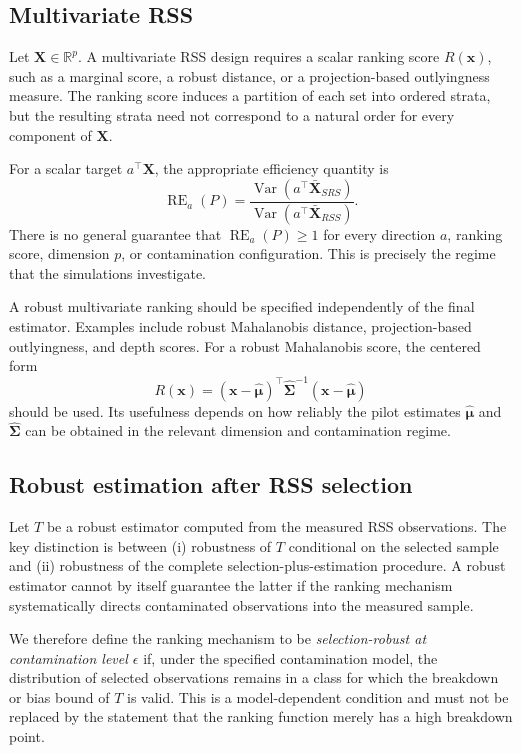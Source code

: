 \documentclass[12pt]{article}
\begin{document}
\subsection{Multivariate RSS}
Let $\mathbf X\in\mathbb R^p$. A multivariate RSS design requires a scalar ranking score $R(\mathbf x)$, such as a marginal score, a robust distance, or a projection-based outlyingness measure. The ranking score induces a partition of each set into ordered strata, but the resulting strata need not correspond to a natural order for every component of $\mathbf X$.

For a scalar target $a^\top\mathbf X$, the appropriate efficiency quantity is
\begin{equation}
\label{eq:multivariate_target}
\operatorname{RE}_a(P)=
\frac{\operatorname{Var}(a^\top\bar{\mathbf X}_{SRS})}
{\operatorname{Var}(a^\top\bar{\mathbf X}_{RSS})}.
\end{equation}
There is no general guarantee that $\operatorname{RE}_a(P)\geq1$ for every direction $a$, ranking score, dimension $p$, or contamination configuration. This is precisely the regime that the simulations investigate.

A robust multivariate ranking should be specified independently of the final estimator. Examples include robust Mahalanobis distance, projection-based outlyingness, and depth scores. For a robust Mahalanobis score, the centered form
\[
R(\mathbf x)=(\mathbf x-\hat{\boldsymbol\mu})^\top
\hat{\boldsymbol\Sigma}^{-1}(\mathbf x-\hat{\boldsymbol\mu})
\]
should be used. Its usefulness depends on how reliably the pilot estimates $\hat{\boldsymbol\mu}$ and $\hat{\boldsymbol\Sigma}$ can be obtained in the relevant dimension and contamination regime.

\subsection{Robust estimation after RSS selection}
Let $T$ be a robust estimator computed from the measured RSS observations. The key distinction is between (i) robustness of $T$ conditional on the selected sample and (ii) robustness of the complete selection-plus-estimation procedure. A robust estimator cannot by itself guarantee the latter if the ranking mechanism systematically directs contaminated observations into the measured sample.

We therefore define the ranking mechanism to be \emph{selection-robust at contamination level $\epsilon$} if, under the specified contamination model, the distribution of selected observations remains in a class for which the breakdown or bias bound of $T$ is valid. This is a model-dependent condition and must not be replaced by the statement that the ranking function merely has a high breakdown point.
\end{document}
